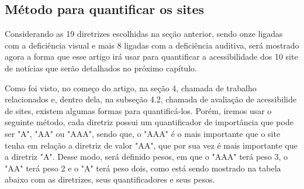 \documentclass[a4paper]{article}
\begin{document}
\begin{titlepage}
\subsection{Método para quantificar os sites}

Considerando as 19 diretrizes escolhidas na seção anterior, sendo onze ligadas com a deficiência visual e mais 8 ligadas com a deficiência auditiva, será mostrado agora a forma que esse artigo irá usar para quantificar a acessibilidade dos 10 site de notícias que serão detalhados no próximo capítulo.

Como foi visto, no começo do artigo, na seção 4, chamada de trabalho relacionados e, dentro dela, na subseção 4.2, chamada de avaliação de acessibilide de sites, existem algumas formas para quantificá-los. Porém, iremos usar o seguinte método, cada diretriz possui um quantificador de importância que pode ser "A", "AA" ou "AAA", sendo que, o "AAA" é o mais importante que o site tenha em relação a diretriz de valor "AA", que por sua vez é mais importante que a diretriz "A". Desse modo, será definido pesos, em que o "AAA" terá peso 3, o "AA" terá peso 2 e o "A" terá peso dois, como está sendo mostrado na tabela abaixo com as diretrizes, seus quantificadores e seus pesos.\\


\end{titlepage}
\end{document}
